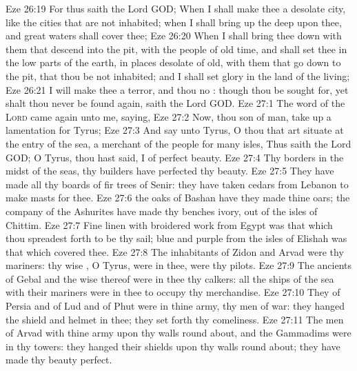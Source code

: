 \vs Eze 26:19 For thus saith the Lord GOD; When I shall make thee a desolate city, like the cities that are not inhabited; when I shall bring up the deep upon thee, and great waters shall cover thee;
\vs Eze 26:20 When I shall bring thee down with them that descend into the pit, with the people of old time, and shall set thee in the low parts of the earth, in places desolate of old, with them that go down to the pit, that thou be not inhabited; and I shall set glory in the land of the living;
\vs Eze 26:21 I will make thee a terror, and thou  no : though thou be sought for, yet shalt thou never be found again, saith the Lord GOD.
\vs Eze 27:1 The word of the \textsc{Lord} came again unto me, saying,
\vs Eze 27:2 Now, thou son of man, take up a lamentation for Tyrus;
\vs Eze 27:3 And say unto Tyrus, O thou that art situate at the entry of the sea,  a merchant of the people for many isles, Thus saith the Lord GOD; O Tyrus, thou hast said, I  of perfect beauty.
\vs Eze 27:4 Thy borders  in the midst of the seas, thy builders have perfected thy beauty.
\vs Eze 27:5 They have made all thy  boards of fir trees of Senir: they have taken cedars from Lebanon to make masts for thee.
\vs Eze 27:6  the oaks of Bashan have they made thine oars; the company of the Ashurites have made thy benches  ivory,  out of the isles of Chittim.
\vs Eze 27:7 Fine linen with broidered work from Egypt was that which thou spreadest forth to be thy sail; blue and purple from the isles of Elishah was that which covered thee.
\vs Eze 27:8 The inhabitants of Zidon and Arvad were thy mariners: thy wise , O Tyrus,  were in thee, were thy pilots.
\vs Eze 27:9 The ancients of Gebal and the wise  thereof were in thee thy calkers: all the ships of the sea with their mariners were in thee to occupy thy merchandise.
\vs Eze 27:10 They of Persia and of Lud and of Phut were in thine army, thy men of war: they hanged the shield and helmet in thee; they set forth thy comeliness.
\vs Eze 27:11 The men of Arvad with thine army  upon thy walls round about, and the Gammadims were in thy towers: they hanged their shields upon thy walls round about; they have made thy beauty perfect.
